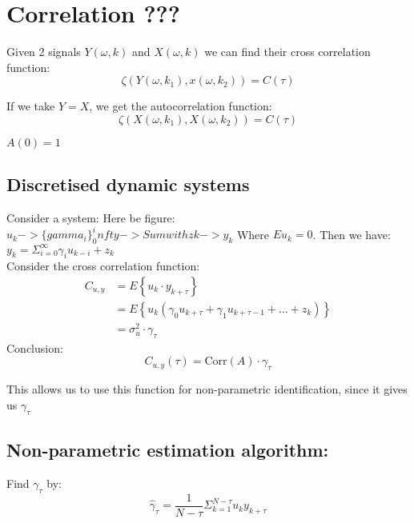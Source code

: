 \chapter{Correlation ???}


Given 2 signals $Y(\omega,k)$ and  $X(\omega,k)$ we can find their cross correlation function:
 \begin{equation}
    \zeta(Y(\omega,k_1),x(\omega,k_2)) = C(\tau)
\end{equation}

If we take $Y = X$, we get the autocorrelation function:
 \begin{equation}
    \zeta(X(\omega,k_1),X(\omega,k_2)) = C(\tau)
\end{equation}


\ex{}
{
    $A(0) = 1$
}

\section{Discretised dynamic systems}
Consider a system:
\nt
{
    Here be figure:\\
    $
    u_k -> \{gamma_i\}_0^infty -> Sum with zk -> y_k
    $
}
Where $Eu_k = 0$.
Then we have:  $y_k = \Sigma_{i=0}^{\infty}\gamma_iu_{k-i} + z_k$
\\
Consider the cross correlation function:
\begin{equation}
    \begin{aligned}
        C_{u,y} &   = E\left\{ u_k \cdot y_{k+\tau}\right\} \\
                &= E\left\{ u_k(\gamma_0 u_{k+\tau} + \gamma_1u_{k+\tau-1}+\dots+z_k)\right\}\\
                &= \sigma^{2}_u \cdot \gamma_\tau
    \end{aligned}
\end{equation}
Conclusion:
\begin{equation}
    C_{u,y}(\tau) = \text{Corr}(A)\cdot\gamma_\tau
\end{equation}

This allows us to use this function for non-parametric identification, since it gives us $\gamma_\tau$
\section{Non-parametric estimation algorithm:}
Find $\gamma_\tau$ by:
\begin{equation}
    \hat{\gamma}_\tau = \frac{1}{N-\tau} \Sigma_{k=1}^{N-\tau}u_ky_{k+\tau}
\end{equation}

